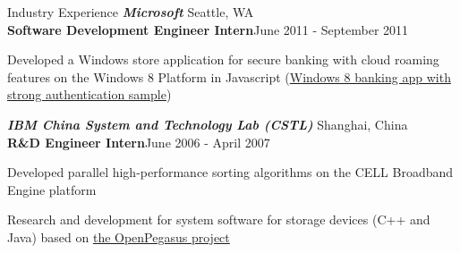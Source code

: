 \documentclass{resume} %
\begin{document}
\begin{rSection}{Industry Experience}
{\large
\emph{\textbf{Microsoft}}	\hfill{Seattle, WA}\\
}
\textbf{Software Development Engineer Intern}\hfill{June 2011 - September 2011} 
\begin{itemize}
{\small
\item Developed a Windows store application for secure banking with cloud roaming features on the Windows 8 Platform in Javascript
(\hyperref{http://code.msdn.microsoft.com/windowsapps/Metro-style-banking-app-7d963c00}{}{}{Windows 8 banking app with strong authentication sample})
}
\end{itemize}

{\large
\emph{\textbf{IBM China System and Technology Lab (CSTL)}}	\hfill{Shanghai, China}\\
}
\textbf{R\&D Engineer Intern}\hfill{June 2006 - April 2007} 
\vspace{-0.5em}
\begin{itemize}
{\small
\item Developed parallel high-performance sorting algorithms on the CELL Broadband Engine platform
\vspace{-0.5em}
\item Research and development for system software for storage devices (C++ and Java) based on 
\hyperref{http://www.opengroup.org/subjectareas/management/openpegasus}{}{}{the OpenPegasus project}
}
\end{itemize}

\end{rSection}
\end{document}
